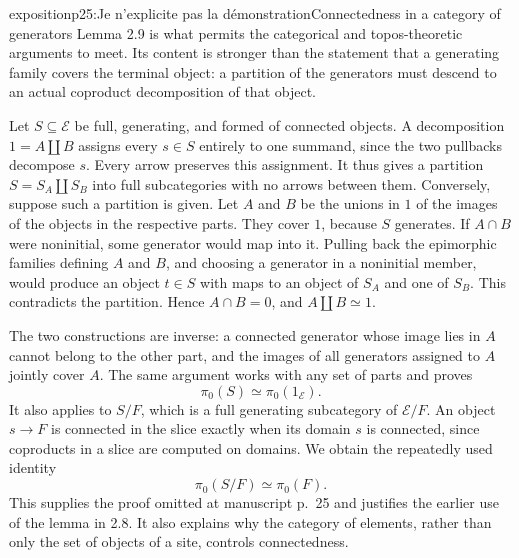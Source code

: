 \begin{dcomment}{exposition}{p25:Je n'explicite pas la démonstration}{Connectedness in a category of generators}
Lemma 2.9 is what permits the categorical and topos-theoretic arguments to meet. Its content is stronger than the statement that a generating family covers the terminal object: a partition of the generators must descend to an actual coproduct decomposition of that object.

Let $S\subseteq\mathcal E$ be full, generating, and formed of connected objects. A decomposition $1=A\amalg B$ assigns every $s\in S$ entirely to one summand, since the two pullbacks decompose $s$. Every arrow preserves this assignment. It thus gives a partition $S=S_A\amalg S_B$ into full subcategories with no arrows between them. Conversely, suppose such a partition is given. Let $A$ and $B$ be the unions in $1$ of the images of the objects in the respective parts. They cover $1$, because $S$ generates. If $A\cap B$ were noninitial, some generator would map into it. Pulling back the epimorphic families defining $A$ and $B$, and choosing a generator in a noninitial member, would produce an object $t\in S$ with maps to an object of $S_A$ and one of $S_B$. This contradicts the partition. Hence $A\cap B=0$, and $A\amalg B\simeq1$.

The two constructions are inverse: a connected generator whose image lies in $A$ cannot belong to the other part, and the images of all generators assigned to $A$ jointly cover $A$. The same argument works with any set of parts and proves
\[
 \pi _0(S)\simeq\pi _0(1_{\mathcal E}).
\]
It also applies to $S/F$, which is a full generating subcategory of $\mathcal E/F$. An object $s\to F$ is connected in the slice exactly when its domain $s$ is connected, since coproducts in a slice are computed on domains. We obtain the repeatedly used identity
\[
 \pi _0(S/F)\simeq\pi _0(F).
\]
This supplies the proof omitted at manuscript p.~25 and justifies the earlier use of the lemma in 2.8. It also explains why the category of elements, rather than only the set of objects of a site, controls connectedness.
\end{dcomment}

